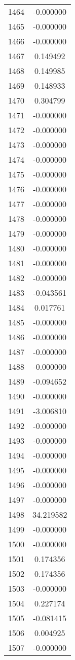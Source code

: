 \documentclass[12pt]{article}
\begin{document}
\begin{longtable}{@{}cc@{}}
1464 & -0.000000 \\
1465 & -0.000000 \\
1466 & -0.000000 \\
1467 & 0.149492 \\
1468 & 0.149985 \\
1469 & 0.148933 \\
1470 & 0.304799 \\
1471 & -0.000000 \\
1472 & -0.000000 \\
1473 & -0.000000 \\
1474 & -0.000000 \\
1475 & -0.000000 \\
1476 & -0.000000 \\
1477 & -0.000000 \\
1478 & -0.000000 \\
1479 & -0.000000 \\
1480 & -0.000000 \\
1481 & -0.000000 \\
1482 & -0.000000 \\
1483 & -0.043561 \\
1484 & 0.017761 \\
1485 & -0.000000 \\
1486 & -0.000000 \\
1487 & -0.000000 \\
1488 & -0.000000 \\
1489 & -0.094652 \\
1490 & -0.000000 \\
1491 & -3.006810 \\
1492 & -0.000000 \\
1493 & -0.000000 \\
1494 & -0.000000 \\
1495 & -0.000000 \\
1496 & -0.000000 \\
1497 & -0.000000 \\
1498 & 34.219582 \\
1499 & -0.000000 \\
1500 & -0.000000 \\
1501 & 0.174356 \\
1502 & 0.174356 \\
1503 & -0.000000 \\
1504 & 0.227174 \\
1505 & -0.081415 \\
1506 & 0.004925 \\
1507 & -0.000000 \\

\end{longtable}
\end{document}
